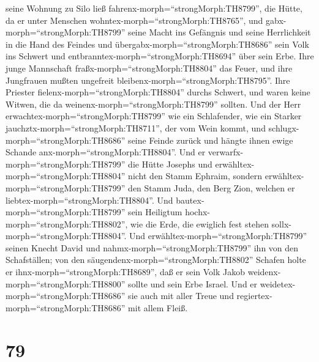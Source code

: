 seine Wohnung zu Silo ließ fahrenx-morph=``strongMorph:TH8799'', die
Hütte, da er unter Menschen wohntex-morph=``strongMorph:TH8765'',
 und gabx-morph=``strongMorph:TH8799'' seine Macht ins
Gefängnis und seine Herrlichkeit in die Hand des Feindes 
und übergabx-morph=``strongMorph:TH8686'' sein Volk ins Schwert und
entbranntex-morph=``strongMorph:TH8694'' über sein Erbe. 
Ihre junge Mannschaft fraßx-morph=``strongMorph:TH8804'' das Feuer, und
ihre Jungfrauen mußten ungefreit bleibenx-morph=``strongMorph:TH8795''.
 Ihre Priester fielenx-morph=``strongMorph:TH8804'' durchs
Schwert, und waren keine Witwen, die da
weinenx-morph=``strongMorph:TH8799'' sollten.  Und der Herr
erwachtex-morph=``strongMorph:TH8799'' wie ein Schlafender, wie ein
Starker jauchztx-morph=``strongMorph:TH8711'', der vom Wein kommt,
 und schlugx-morph=``strongMorph:TH8686'' seine Feinde
zurück und hängte ihnen ewige Schande anx-morph=``strongMorph:TH8804''.
 Und er verwarfx-morph=``strongMorph:TH8799'' die Hütte
Josephs und erwähltex-morph=``strongMorph:TH8804'' nicht den Stamm
Ephraim,  sondern erwähltex-morph=``strongMorph:TH8799''
den Stamm Juda, den Berg Zion, welchen er
liebtex-morph=``strongMorph:TH8804''.  Und
bautex-morph=``strongMorph:TH8799'' sein Heiligtum
hochx-morph=``strongMorph:TH8802'', wie die Erde, die ewiglich fest
stehen sollx-morph=``strongMorph:TH8804''.  Und
erwähltex-morph=``strongMorph:TH8799'' seinen Knecht David und
nahmx-morph=``strongMorph:TH8799'' ihn von den Schafställen;
 von den säugendenx-morph=``strongMorph:TH8802'' Schafen
holte er ihnx-morph=``strongMorph:TH8689'', daß er sein Volk Jakob
weidenx-morph=``strongMorph:TH8800'' sollte und sein Erbe Israel.
 Und er weidetex-morph=``strongMorph:TH8686'' sie auch mit
aller Treue und regiertex-morph=``strongMorph:TH8686'' mit allem Fleiß.

\hypertarget{section-78}{%
\section{79}\label{section-78}}

